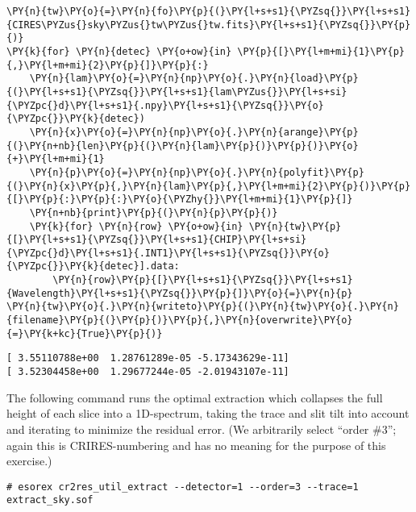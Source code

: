     \begin{tcolorbox}[breakable, size=fbox, boxrule=1pt, pad at break*=1mm,colback=cellbackground, colframe=cellborder]
\begin{Verbatim}[commandchars=\\\{\}]
\PY{n}{tw}\PY{o}{=}\PY{n}{fo}\PY{p}{(}\PY{l+s+s1}{\PYZsq{}}\PY{l+s+s1}{CIRES\PYZus{}sky\PYZus{}tw\PYZus{}tw.fits}\PY{l+s+s1}{\PYZsq{}}\PY{p}{)}
\PY{k}{for} \PY{n}{detec} \PY{o+ow}{in} \PY{p}{[}\PY{l+m+mi}{1}\PY{p}{,}\PY{l+m+mi}{2}\PY{p}{]}\PY{p}{:}
    \PY{n}{lam}\PY{o}{=}\PY{n}{np}\PY{o}{.}\PY{n}{load}\PY{p}{(}\PY{l+s+s1}{\PYZsq{}}\PY{l+s+s1}{lam\PYZus{}}\PY{l+s+si}{\PYZpc{}d}\PY{l+s+s1}{.npy}\PY{l+s+s1}{\PYZsq{}}\PY{o}{\PYZpc{}}\PY{k}{detec})
    \PY{n}{x}\PY{o}{=}\PY{n}{np}\PY{o}{.}\PY{n}{arange}\PY{p}{(}\PY{n+nb}{len}\PY{p}{(}\PY{n}{lam}\PY{p}{)}\PY{p}{)}\PY{o}{+}\PY{l+m+mi}{1} 
    \PY{n}{p}\PY{o}{=}\PY{n}{np}\PY{o}{.}\PY{n}{polyfit}\PY{p}{(}\PY{n}{x}\PY{p}{,}\PY{n}{lam}\PY{p}{,}\PY{l+m+mi}{2}\PY{p}{)}\PY{p}{[}\PY{p}{:}\PY{p}{:}\PY{o}{\PYZhy{}}\PY{l+m+mi}{1}\PY{p}{]}
    \PY{n+nb}{print}\PY{p}{(}\PY{n}{p}\PY{p}{)}
    \PY{k}{for} \PY{n}{row} \PY{o+ow}{in} \PY{n}{tw}\PY{p}{[}\PY{l+s+s1}{\PYZsq{}}\PY{l+s+s1}{CHIP}\PY{l+s+si}{\PYZpc{}d}\PY{l+s+s1}{.INT1}\PY{l+s+s1}{\PYZsq{}}\PY{o}{\PYZpc{}}\PY{k}{detec}].data:
        \PY{n}{row}\PY{p}{[}\PY{l+s+s1}{\PYZsq{}}\PY{l+s+s1}{Wavelength}\PY{l+s+s1}{\PYZsq{}}\PY{p}{]}\PY{o}{=}\PY{n}{p}
\PY{n}{tw}\PY{o}{.}\PY{n}{writeto}\PY{p}{(}\PY{n}{tw}\PY{o}{.}\PY{n}{filename}\PY{p}{(}\PY{p}{)}\PY{p}{,}\PY{n}{overwrite}\PY{o}{=}\PY{k+kc}{True}\PY{p}{)}
\end{Verbatim}
\end{tcolorbox}

    \begin{Verbatim}[commandchars=\\\{\}]
[ 3.55110788e+00  1.28761289e-05 -5.17343629e-11]
[ 3.52304458e+00  1.29677244e-05 -2.01943107e-11]
    \end{Verbatim}

    The following command runs the optimal extraction which collapses the
full height of each slice into a 1D-spectrum, taking the trace and slit
tilt into account and iterating to minimize the residual error. (We
arbitrarily select ``order \#3''; again this is CRIRES-numbering and has
no meaning for the purpose of this exercise.)

\begin{verbatim}
# esorex cr2res_util_extract --detector=1 --order=3 --trace=1 extract_sky.sof
\end{verbatim}

